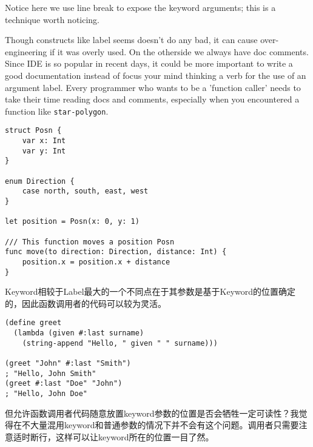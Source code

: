 \documentclass[11pt]{article}
\begin{document}
Notice here we use line break to expose the keyword arguments; this is a technique worth noticing.

Though constructs like label seems doesn't do any bad, it can cause over-engineering if it was overly used. On the otherside we always have doc comments. Since IDE is so popular in recent days, it could be more important to write a good documentation instead of focus your mind thinking a verb for the use of an argument label. Every programmer who wants to be a 'function caller' needs to take their time reading docs and comments, especially when you encountered a function like \texttt{star-polygon}.

\begin{verbatim}
struct Posn {
    var x: Int
    var y: Int
}

enum Direction {
    case north, south, east, west
}

let position = Posn(x: 0, y: 1)

/// This function moves a position Posn
func move(to direction: Direction, distance: Int) {
    position.x = position.x + distance
}
\end{verbatim}

Keyword相较于Label最大的一个不同点在于其参数是基于Keyword的位置确定的，因此函数调用者的代码可以较为灵活。

\begin{verbatim}
(define greet
  (lambda (given #:last surname)
    (string-append "Hello, " given " " surname)))

(greet "John" #:last "Smith")
; "Hello, John Smith"
(greet #:last "Doe" "John")
; "Hello, John Doe"
\end{verbatim}

但允许函数调用者代码随意放置keyword参数的位置是否会牺牲一定可读性？我觉得在不大量混用keyword和普通参数的情况下并不会有这个问题。调用者只需要注意适时断行，这样可以让keyword所在的位置一目了然。
\end{document}
